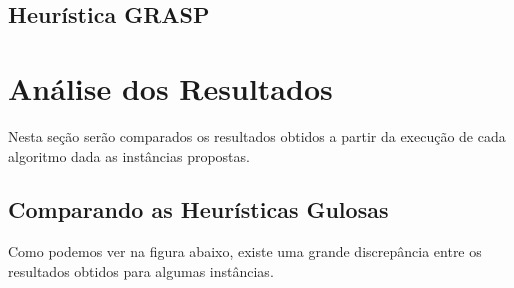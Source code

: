 \documentclass[a4paper, 12pt]{article}
\begin{document}
\subsection{Heurística GRASP}
\newpage

\section{Análise dos Resultados}
Nesta seção serão comparados os resultados obtidos a partir da execução de cada algoritmo dada as instâncias propostas.

\subsection{Comparando as Heurísticas Gulosas}

Como podemos ver na figura abaixo, existe uma grande discrepância entre os resultados obtidos para algumas instâncias.

\end{document}
